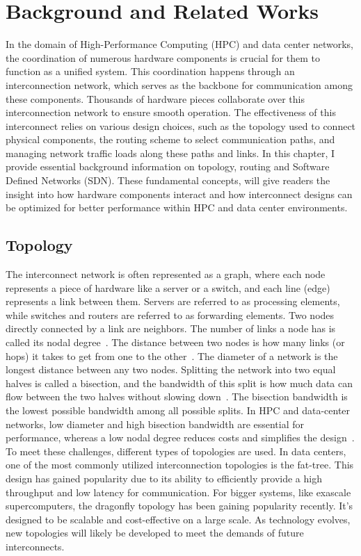 \chapter{Background and Related Works} In the domain of High-Performance
Computing (HPC) and data center networks, the coordination of numerous hardware
components is crucial for them to function as a unified system. This
coordination happens through an interconnection network, which serves as the
backbone for communication among these components. Thousands of hardware pieces
collaborate over this interconnection network to ensure smooth operation. The
effectiveness of this interconnect relies on various design choices, such as the
topology used to connect physical components, the routing scheme to select
communication paths, and managing network traffic loads along these paths and
links.  In this chapter, I provide essential background information on topology,
routing and Software Defined Networks (SDN). These fundamental concepts, will give readers the insight into how hardware components interact and how interconnect designs can be optimized for better performance within HPC and data center environments.

\section{Topology} The interconnect network is often represented as a graph, where each node represents a piece of hardware like a server or a switch,
and each line (edge) represents a link between them. Servers are referred to as processing elements, while switches and routers are referred to as forwarding elements. Two nodes directly connected by a link are neighbors. The
number of links a node has is called its nodal degree~\cite{dally2004principles}. The distance
between two nodes is how many links (or hops) it takes to get from one to
the other~\cite{dally2004principles}. The diameter of a network is the longest distance between any two
nodes.  Splitting the network into two equal halves is called a bisection, and
the bandwidth of this split is how much data can flow between the two halves
without slowing down~\cite{dally2004principles}. The bisection bandwidth is the lowest possible bandwidth
among all possible splits. In HPC and data-center networks, low diameter and high bisection bandwidth are essential for performance, whereas a low nodal degree reduces costs and simplifies the design~\cite{li2016low}. To meet these challenges,
different types of topologies are used. In data centers, one of the most
commonly utilized interconnection topologies is the fat-tree. This design has
gained popularity due to its ability to efficiently provide a high throughput
and low latency for communication. For bigger systems, like exascale
supercomputers, the dragonfly topology has been gaining popularity recently.
It's designed to be scalable and cost-effective on a large scale. As technology
evolves, new topologies will likely be developed to meet the demands of future
interconnects.

